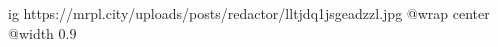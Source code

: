  
 
 
 
 

\ifcmt
  ig https://mrpl.city/uploads/posts/redactor/lltjdq1jsgeadzzl.jpg
  @wrap center
  @width 0.9
\fi
